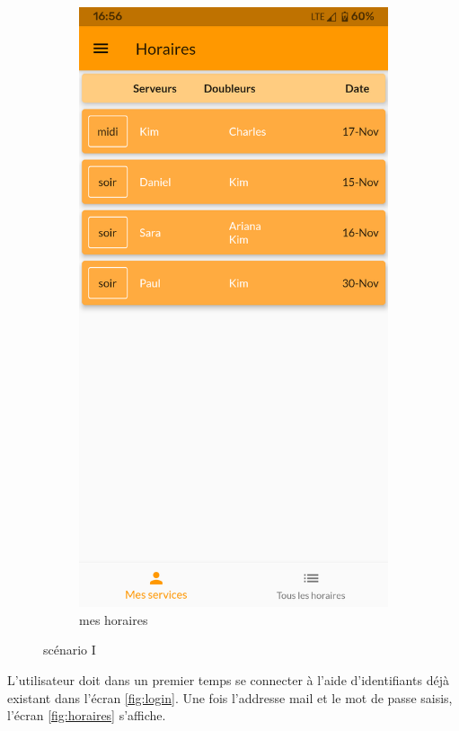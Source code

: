 \begin{figure}[!h]
\begin{subfigure}{.3\textwidth}
        \includegraphics[width=0.9\linewidth]{screenshots/scenario_01/mesHoraires.png}
        \caption{mes horaires}
        \label{fig:mesHoraires}
    \end{subfigure}
    \caption{scénario I}
    \label{fig:scen01}
\end{figure}

L'utilisateur doit dans un premier temps se connecter à l'aide d'identifiants déjà existant dans l'écran \ref{fig:login}. Une fois l'addresse mail et le mot de passe saisis, 
l'écran \ref{fig:horaires} s'affiche. 


